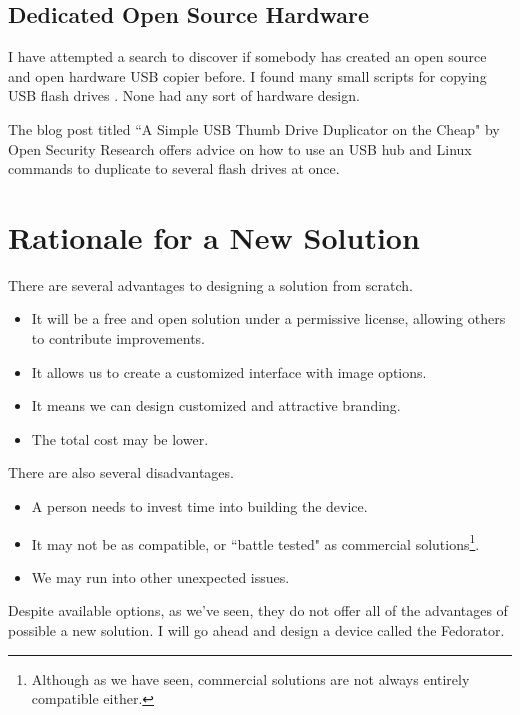         \subsection{Dedicated Open Source Hardware}
            I have attempted a search to discover if somebody has created an open source and open hardware USB copier before.  I found many small scripts for copying USB flash drives \cite{github-usbmk} \cite{github-auc-automaticly-usb-copier} \cite{github-udev-serialcopier}.  None had any sort of hardware design.
            
            The blog post titled ``A Simple USB Thumb Drive Duplicator on the Cheap" by Open Security Research \cite{open-security-research-simple-duplicator} offers advice on how to use an USB hub and Linux commands to duplicate to several flash drives at once. 
            
    \section{Rationale for a New Solution}
        There are several advantages to designing a solution from scratch.
        
        \begin{itemize}
            \item It will be a free and open solution under a permissive license, allowing others to contribute improvements.
            \item It allows us to create a customized interface with image options.
            \item It means we can design customized and attractive branding.
            \item The total cost may be lower.
        \end{itemize}
        
        There are also several disadvantages. 
        \begin{itemize}
            \item A person needs to invest time into building the device.
            \item It may not be as compatible, or ``battle tested" as commercial solutions\footnote{Although as we have seen, commercial solutions are not always entirely compatible either.}.
            \item We may run into other unexpected issues.
        \end{itemize}
        
        Despite available options, as we've seen, they do not offer all of the advantages of possible a new solution.  I will go ahead and design a device called the Fedorator.

